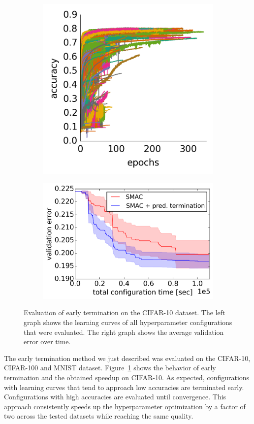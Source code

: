 \begin{figure}[t]
	\begin{subfigure}{0.4\textwidth}
		\centering
		\includegraphics[width=0.9\linewidth]{gfx/earlyterm/samples.png}
	\end{subfigure}
	\begin{subfigure}{0.6\textwidth}
		\centering
		\includegraphics[width=0.8\linewidth]{gfx/earlyterm/time.png}
	\end{subfigure}
	\caption{
		Evaluation of early termination on the CIFAR-10 dataset.
		The left graph shows the learning curves of all hyperparameter configurations that were evaluated.
		The right graph shows the average validation error over time.
	}\label{fig:earlyterm:eval}
\end{figure}
The early termination method we just described was evaluated on the CIFAR-10, CIFAR-100 and MNIST dataset.
Figure~\ref{fig:earlyterm:eval} shows the behavior of early termination and the obtained speedup on CIFAR-10.
As expected, configurations with learning curves that tend to approach low accuracies are terminated early.
Configurations with high accuracies are evaluated until convergence.
This approach consistently speeds up the hyperparameter optimization by a factor of two across the tested datasets while reaching the same quality.
